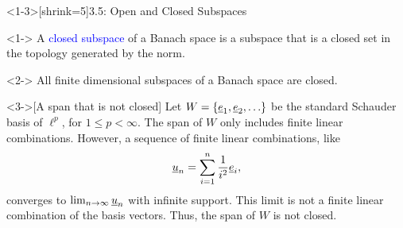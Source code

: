 \documentclass[10pt,english,aspectratio=169]{beamer}
\begin{document}
\begin{frame}<1-3>[shrink=5]{3.5: Open and Closed Subspaces}

\begin{definition}<1->
A \textcolor{blue}{closed subspace} of a Banach space is a subspace that is a closed set in the topology generated by the norm.
\end{definition}
\vspace{-0.5mm}

\begin{theorem}<2->
All finite dimensional subspaces of a Banach space are closed.
\end{theorem}
\vspace{-0.5mm}

\begin{example}<3->[A span that is not closed]
Let $W = \{\underline{e}_1 ,\underline{e}_2 , \ldots \}$ be the standard Schauder basis of $\ell^p$, for $1 \leq p < \infty$.
The span of $W$ only includes finite linear combinations.
However, a sequence of finite linear combinations, like \vspace{-2mm}
\[ \vecnot{u}_n = \sum_{i=1}^n \frac{1}{i^2} \vecnot{e}_i , \vspace{-1.5mm} \]  converges to $\lim_{n\to \infty} \underline{u}_n$ with infinite support.
This limit is not a finite linear combination of the basis vectors. Thus, the span of $W$ is not closed.
\end{example}
\vspace{-0.5mm}



\end{frame}
\end{document}
